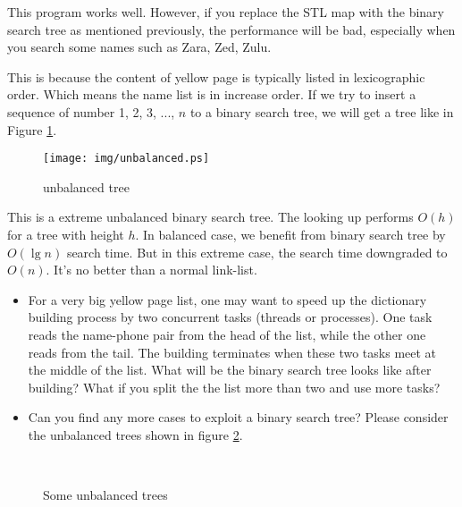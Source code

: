 \documentclass{article}
\begin{document}
This program works well. However, if you replace the STL map
with the binary search tree as mentioned previously, the
performance will be bad, especially when you search some names such
as Zara, Zed, Zulu.

This is because the content of yellow page is typically listed
in lexicographic order. Which means the name list is in increase
order. If we try to insert a sequence of number 1, 2, 3, ..., $n$
to a binary search tree, we will get a tree like in Figure \ref{fig:unbalanced-tree}.

\begin{figure}[htbp]
       \centering
	\texttt{[image: img/unbalanced.ps]}
        \caption{unbalanced tree} \label{fig:unbalanced-tree}
\end{figure}

This is a extreme unbalanced binary search tree. The looking up performs
$O(h)$ for a tree with height $h$. In balanced case, we benefit from
binary search tree by $O(\lg n)$ search time. But in this extreme case,
the search time downgraded to $O(n)$. It's no better than a normal link-list.

\begin{Exercise}

\begin{itemize}
\item For a very big yellow page list, one may want to speed up the
dictionary building process by two concurrent tasks (threads or processes).
One task reads the name-phone pair from the head of the list, while the
other one reads from the tail. The building terminates when these
two tasks meet at the middle of the list. What will be the binary
search tree looks like after building? What if you split the the
list more than two and use more tasks?

\item Can you find any more cases to exploit a binary search tree?
Please consider the unbalanced trees shown in figure
\ref{fig:unbalanced-trees}.
\end{itemize}

\end{Exercise}

\begin{figure}[htbp]
       \centering
        \\
       \caption{Some unbalanced trees}
       \label{fig:unbalanced-trees}
\end{figure}
\end{document}
